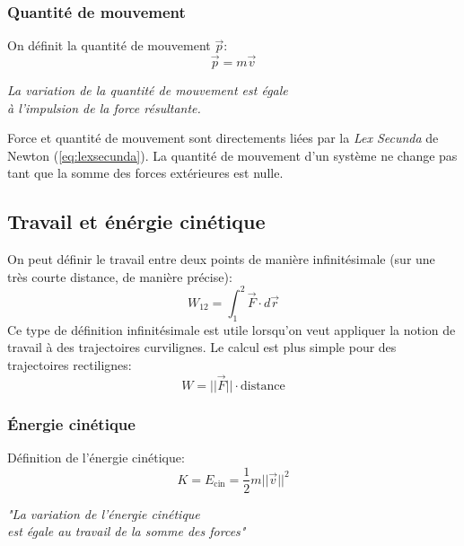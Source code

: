 \documentclass{article}
\numberwithin{equation}{section}
\begin{document}
\subsubsection{Quantité de mouvement}
On définit la quantité de mouvement \(\vec p\):
\begin{equation} \label{eq:defquantitemouvement}
	\boxed{ \vec p = m \vec v }
\end{equation}

\begin{center}
	\emph{La variation de la quantité de mouvement est égale \\ à l'impulsion de la force résultante.}
\end{center}

Force et quantité de mouvement sont directements liées par la \emph{Lex Secunda} de Newton (\ref{eq:lexsecunda}). La quantité de mouvement d'un système ne change pas tant que la somme des forces extérieures est nulle.

\subsection{Travail et énérgie cinétique}

On peut définir le travail entre deux points de manière infinitésimale (sur une très courte distance, de manière précise):
\begin{equation}
	\boxed{ W_{12} = \int_1^2 \vec F \cdot d \vec r }
\end{equation}
Ce type de définition infinitésimale est utile lorsqu'on veut appliquer la notion de travail à des trajectoires curvilignes. Le calcul est plus simple pour des trajectoires rectilignes:
\begin{equation}
	\boxed{ W = ||\vec F|| \cdot \text{distance} }
\end{equation}

\subsubsection{Énergie cinétique}
Définition de l'énergie cinétique:
\begin{equation}
	\boxed{ K = E_\text{cin} = \frac{1}{2} m ||\vec v||^2 }
\end{equation}

\begin{center}
	\emph{"La variation de l'énergie cinétique \\ est égale au travail de la somme des forces"}
\end{center}
\end{document}
